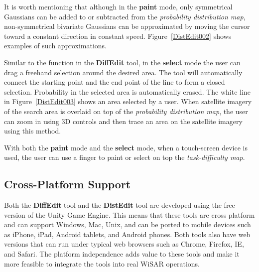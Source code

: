 It is worth mentioning that although in the \textbf{paint} mode, only symmetrical Gaussians can be added to or subtracted from the \textit{probability distribution map}, non-symmetrical bivariate Gaussians can be approximated by moving the cursor toward a constant direction in constant speed. Figure~\ref{DistEdit002} shows examples of such approximations.

Similar to the function in the \textbf{DiffEdit} tool, in the \textbf{select} mode the user can drag a freehand selection around the desired area. The tool will automatically connect the starting point and the end point of the line to form a closed selection. Probability in the selected area is automatically erased. The white line in Figure~\ref{DistEdit003} shows an area selected by a user. When satellite imagery of the search area is overlaid on top of the \textit{probability distribution map}, the user can zoom in using 3D controls and then trace an area on the satellite imagery using this method.

With both the \textbf{paint} mode and the \textbf{select} mode, when a touch-screen device is used, the user can use a finger to paint or select on top the \textit{task-difficulty map}.

\subsection{Cross-Platform Support}

Both the \textbf{DiffEdit} tool and the \textbf{DistEdit} tool are developed using the free version of the Unity Game Engine. This means that these tools are cross platform and can support Windows, Mac, Unix, and can be ported to mobile devices such as iPhone, iPad, Android tablets, and Android phones. Both tools also have web versions that can run under typical web browsers such as Chrome, Firefox, IE, and Safari. The platform independence adds value to these tools and make it more feasible to integrate the tools into real WiSAR operations.